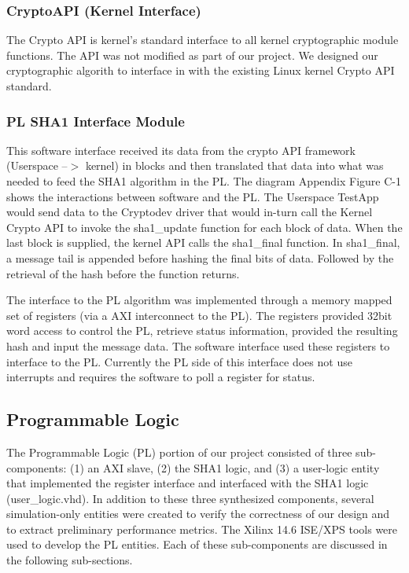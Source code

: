 \documentclass[journal]{IEEEtran}
\begin{document}
\subsubsection{CryptoAPI (Kernel Interface)}
The Crypto API is kernel's standard interface to all kernel cryptographic module functions.  The API was not modified as part of our project.  We designed our cryptographic algorith to interface in with the existing Linux kernel Crypto API standard.
\subsubsection{PL SHA1 Interface Module}
This software interface received its data from the crypto API framework (Userspace --$>$ kernel) in blocks and then translated that data into what was needed to feed the SHA1 algorithm in the PL.  The diagram Appendix Figure C-1 shows the interactions between software and the PL.  The Userspace TestApp would send data to the Cryptodev driver that would in-turn call the Kernel Crypto API to invoke the sha1\_update function for each block of data.  When the last block is supplied, the kernel API calls the sha1\_final function.  In sha1\_final, a message tail is appended before hashing the final bits of data.  Followed by the retrieval of the hash before the function returns.  

The interface to the PL algorithm was implemented through a memory mapped set of registers (via a AXI interconnect to the PL).  The registers provided 32bit word access to control the PL, retrieve status information, provided the resulting hash and input the message data.  The software interface used these registers to interface to the PL.  Currently the PL side of this interface does not use interrupts and requires the software to poll a register for status. 
 
\subsection{Programmable Logic}
The Programmable Logic (PL) portion of our project consisted of three sub-components: (1) an AXI slave, (2) the SHA1 logic, and (3) a user-logic entity that implemented the register interface and interfaced with the SHA1 logic (user\_logic.vhd).  In addition to these three synthesized components, several simulation-only entities were created to verify the correctness of our design and to extract preliminary performance metrics.
The Xilinx 14.6 ISE/XPS tools were used to develop the PL entities.  Each of these sub-components are discussed in the following sub-sections.
\end{document}
